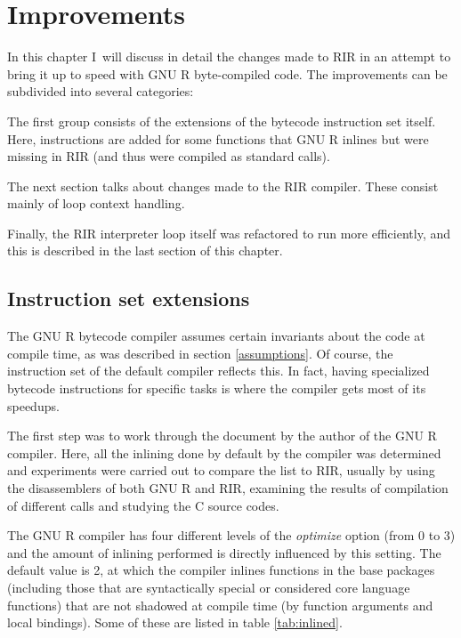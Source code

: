 \chapter{Improvements\label{improvements}}

In this chapter I~will discuss in detail the changes made to RIR in an attempt to bring it up to speed with GNU R byte-compiled code. The improvements can be subdivided into several categories:

The first group consists of the extensions of the bytecode instruction set itself. Here, instructions are added for some functions that GNU R inlines but were missing in RIR (and thus were compiled as standard calls).

The next section talks about changes made to the RIR compiler. These consist mainly of loop context handling.

Finally, the RIR interpreter loop itself was refactored to run more efficiently, and this is described in the last section of this chapter.


\section{Instruction set extensions}

The GNU R bytecode compiler assumes certain invariants about the code at compile time, as was described in section \ref{assumptions}. Of course, the instruction set of the default compiler reflects this. In fact, having specialized bytecode instructions for specific tasks is where the compiler gets most of its speedups.

The first step was to work through the document \autocite{compiler} by the author of the GNU R compiler. Here, all the inlining done by default by the compiler was determined and experiments were carried out to compare the list to RIR, usually by using the disassemblers of both GNU R and RIR, examining the results of compilation of different calls and studying the C source codes.

The GNU R compiler has four different levels of the \emph{optimize} option (from 0 to 3) and the amount of inlining performed is directly influenced by this setting. The default value is 2, at which the compiler inlines functions in the base packages (including those that are syntactically special or considered core language functions) that are not shadowed at compile time (by function arguments and local bindings). Some of these are listed in table \ref{tab:inlined}.

